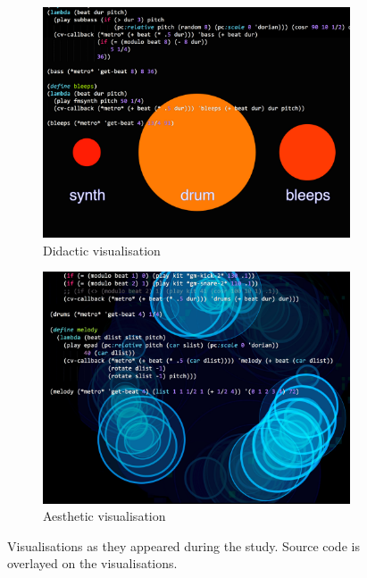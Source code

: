 \begin{figure}
\centering
\begin{subfigure}{.5\textwidth}
  \centering
  \includegraphics[width=.95\linewidth]{../study-2/results/visualisations/didactic-vis-overlay}
  \caption{Didactic visualisation}
  \label{fig:didactic-overlay}
\end{subfigure}%
\begin{subfigure}{.5\textwidth}
  \centering
  \includegraphics[width=.95\linewidth]{../study-2/results/visualisations/aesthetic-vis-overlay}
  \caption{Aesthetic visualisation}
  \label{fig:aesthetic-overlay}
\end{subfigure}

\caption[Visualisations with source code overlay]{Visualisations as they appeared during the study. Source code is overlayed on the visualisations.}
\label{fig:visualisation-overlay}
\end{figure}

